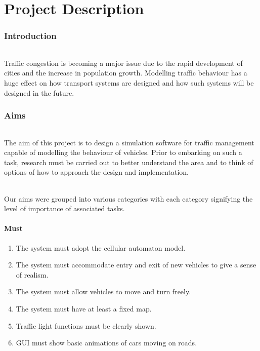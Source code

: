 \documentclass[11pt, a4paper]{article}
\begin{document}
\part*{Project Description}
\section{Introduction} \label{introduction}
\paragraph{}
Traffic congestion is becoming a major issue due to the rapid development of cities and the increase in population growth. Modelling traffic behaviour has a huge effect on how transport systems are designed and how such systems will be designed in the future.

\section{Aims} \label{aims}
\paragraph{}
The aim of this project is to design a simulation software for traffic management capable of modelling the behaviour of vehicles. Prior to embarking on such a task, research must be carried out to better understand the area and to think of options of how to approach the design and implementation.

\paragraph{}
Our aims were grouped into various categories with each category signifying the level of importance of associated tasks.

\subsection{Must} \label{sub:must}
\begin{enumerate}[itemsep = -1ex]
\item The system must adopt the cellular automaton model.
\item The system must accommodate entry and exit of new vehicles to give a sense of realism.
\item The system must allow vehicles to move and turn freely.
\item The system must have at least a fixed map.
\item Traffic light functions must be clearly shown.
\item GUI must show basic animations of cars moving on roads.
\end{enumerate}
\end{document}
